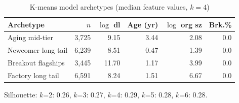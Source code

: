 \begin{table}[t]
\caption{K-means model archetypes (median feature values, $k=4$)}
\label{tab:archetypes}
\centering
\small
\begin{tabular}{lrrrrr}
\toprule
Archetype & $n$ & $\log$ dl & Age (yr) & $\log$ org sz & Brk.\% \\
\midrule
Aging mid-tier & 3,725 & 9.15 & 3.44 & 2.08 & 0.0 \\
Newcomer long tail & 6,239 & 8.51 & 0.47 & 1.39 & 0.0 \\
Breakout flagships & 3,445 & 11.70 & 1.17 & 3.99 & 0.0 \\
Factory long tail & 6,591 & 8.24 & 1.51 & 6.67 & 0.0 \\
\bottomrule
\end{tabular}

{\scriptsize Silhouette: $k$=2: 0.26, $k$=3: 0.27, $k$=4: 0.29, $k$=5: 0.28, $k$=6: 0.28.}
\end{table}
